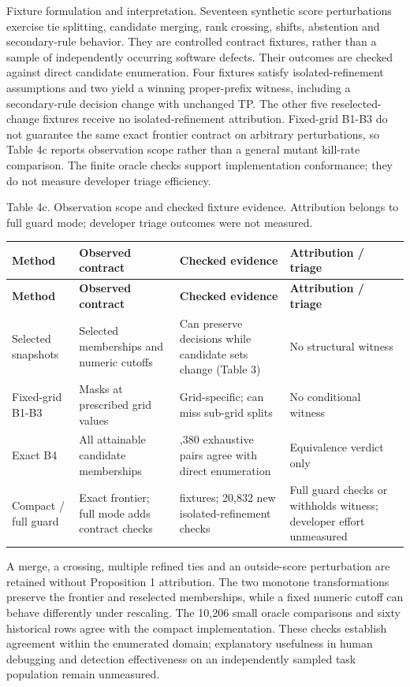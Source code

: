 \documentclass[11pt,a4paper]{article}
\begin{document}
Fixture formulation and interpretation. Seventeen synthetic score perturbations exercise tie splitting, candidate merging, rank crossing, shifts, abstention and secondary-rule behavior. They are controlled contract fixtures, rather than a sample of independently occurring software defects. Their outcomes are checked against direct candidate enumeration. Four fixtures satisfy isolated-refinement assumptions and two yield a winning proper-prefix witness, including a secondary-rule decision change with unchanged TP. The other five reselected-change fixtures receive no isolated-refinement attribution. Fixed-grid B1-B3 do not guarantee the same exact frontier contract on arbitrary perturbations, so Table 4c reports observation scope rather than a general mutant kill-rate comparison. The finite oracle checks support implementation conformance; they do not measure developer triage efficiency.

Table 4c. Observation scope and checked fixture evidence. Attribution belongs to full guard mode; developer triage outcomes were not measured.

{\footnotesize
\setlength{\tabcolsep}{3pt}
\renewcommand{\arraystretch}{1.15}
\begin{longtable}{>{\raggedright\arraybackslash}p{0.18261\dimexpr\textwidth-8\tabcolsep\relax}>{\raggedright\arraybackslash}p{0.23478\dimexpr\textwidth-8\tabcolsep\relax}>{\raggedright\arraybackslash}p{0.27826\dimexpr\textwidth-8\tabcolsep\relax}>{\raggedright\arraybackslash}p{0.30435\dimexpr\textwidth-8\tabcolsep\relax}}
\toprule
\textbf{Method} & \textbf{Observed contract} & \textbf{Checked evidence} & \textbf{Attribution / triage} \\
\midrule
\endfirsthead
\toprule
\textbf{Method} & \textbf{Observed contract} & \textbf{Checked evidence} & \textbf{Attribution / triage} \\
\midrule
\endhead
Selected snapshots & Selected memberships and numeric cutoffs & Can preserve decisions while candidate sets change (Table 3) & No structural witness \\
Fixed-grid B1-B3 & Masks at prescribed grid values & Grid-specific; can miss sub-grid splits & No conditional witness \\
Exact B4 & All attainable candidate memberships & 7,380 exhaustive pairs agree with direct enumeration & Equivalence verdict only \\
Compact / full guard & Exact frontier; full mode adds contract checks & 17 fixtures; 20,832 new isolated-refinement checks & Full guard checks or withholds witness; developer effort unmeasured \\
\bottomrule
\end{longtable}
}
A merge, a crossing, multiple refined ties and an outside-score perturbation are retained without Proposition 1 attribution. The two monotone transformations preserve the frontier and reselected memberships, while a fixed numeric cutoff can behave differently under rescaling. The 10,206 small oracle comparisons and sixty historical rows agree with the compact implementation. These checks establish agreement within the enumerated domain; explanatory usefulness in human debugging and detection effectiveness on an independently sampled task population remain unmeasured.
\end{document}
